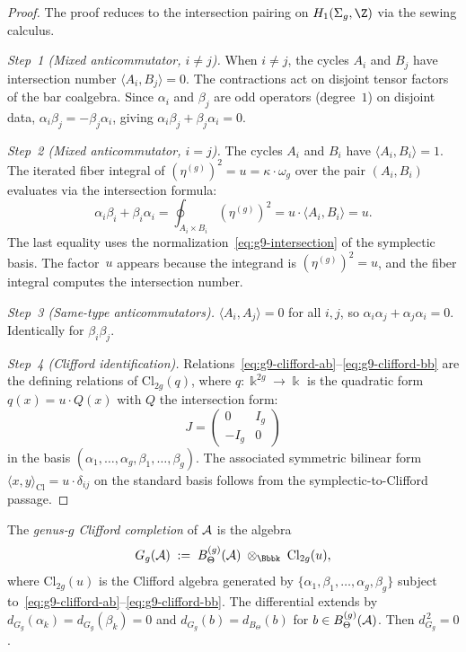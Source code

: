 \begin{proof}
The proof reduces to the intersection pairing on $H_1(\Sigma_g, \Z)$
via the sewing calculus.

\emph{Step~1 (Mixed anticommutator, $i \neq j$).}\;
When $i \neq j$, the cycles $A_i$ and $B_j$ have intersection
number $\langle A_i, B_j \rangle = 0$. The contractions act on
disjoint tensor factors of the bar coalgebra. Since $\alpha_i$ and
$\beta_j$ are odd operators (degree~$1$) on disjoint data,
$\alpha_i \beta_j = -\beta_j \alpha_i$, giving
$\alpha_i\beta_j + \beta_j\alpha_i = 0$.

\emph{Step~2 (Mixed anticommutator, $i = j$).}\;
The cycles $A_i$ and $B_i$ have $\langle A_i, B_i \rangle = 1$.
The iterated fiber integral of $(\eta^{(g)})^2 = u =
\kappa \cdot \omega_g$ over the pair $(A_i, B_i)$ evaluates via
the intersection formula:
\begin{equation}\label{eq:g9-clifford-compute}
\alpha_i \beta_i + \beta_i \alpha_i
= \oint_{A_i \times B_i}
 (\eta^{(g)})^2
= u \cdot \langle A_i, B_i \rangle
= u.
\end{equation}
The last equality uses the normalization~\eqref{eq:g9-intersection}
of the symplectic basis. The factor~$u$ appears because the
integrand is $(\eta^{(g)})^2 = u$, and the fiber integral computes
the intersection number.

\emph{Step~3 (Same-type anticommutators).}\;
$\langle A_i, A_j \rangle = 0$ for all $i, j$, so
$\alpha_i \alpha_j + \alpha_j \alpha_i = 0$. Identically for
$\beta_i \beta_j$.

\emph{Step~4 (Clifford identification).}\;
Relations~\eqref{eq:g9-clifford-ab}--\eqref{eq:g9-clifford-bb}
are the defining relations of $\mathrm{Cl}_{2g}(q)$, where
$q\colon \Bbbk^{2g} \to \Bbbk$ is the quadratic form
$q(x) = u \cdot Q(x)$ with $Q$ the intersection form:
\[
J = \begin{pmatrix}
0 & I_g \\ -I_g & 0
\end{pmatrix}
\]
in the basis $(\alpha_1, \ldots, \alpha_g, \beta_1, \ldots, \beta_g)$.
The associated symmetric bilinear form
$\langle x, y \rangle_{\mathrm{Cl}} = u \cdot \delta_{ij}$ on the
standard basis follows from the symplectic-to-Clifford passage.
\end{proof}

\begin{definition}
\label{def:clifford-completion}
The \emph{genus-$g$ Clifford completion} of $\mathcal{A}$ is the algebra
\begin{equation}\label{eq:g9-clifford-completion}
G_g(\cA)
\;:=\;
B_\Theta^{(g)}(\cA)
\;\otimes_{\Bbbk}\;
\mathrm{Cl}_{2g}(u),
\end{equation}
where $\mathrm{Cl}_{2g}(u)$ is the Clifford algebra generated by
$\{\alpha_1, \beta_1, \ldots, \alpha_g, \beta_g\}$ subject
to~\eqref{eq:g9-clifford-ab}--\eqref{eq:g9-clifford-bb}.
The differential extends by
$d_{G_g}(\alpha_k) = d_{G_g}(\beta_k) = 0$ and
$d_{G_g}(b) = d_{B_\Theta}(b)$ for $b \in B_\Theta^{(g)}(\mathcal{A})$.
Then $d_{G_g}^{\,2} = 0$.
\end{definition}

